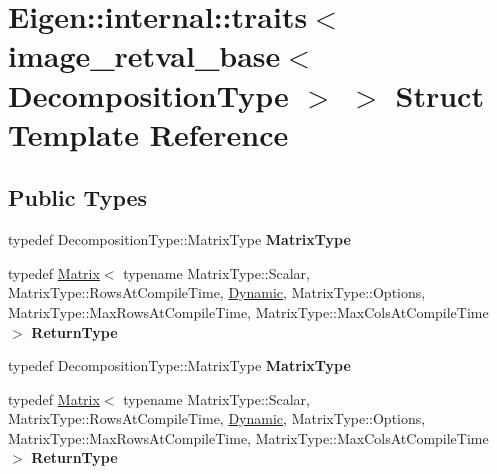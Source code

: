 \hypertarget{struct_eigen_1_1internal_1_1traits_3_01image__retval__base_3_01_decomposition_type_01_4_01_4}{}\section{Eigen\+:\+:internal\+:\+:traits$<$ image\+\_\+retval\+\_\+base$<$ Decomposition\+Type $>$ $>$ Struct Template Reference}
\label{struct_eigen_1_1internal_1_1traits_3_01image__retval__base_3_01_decomposition_type_01_4_01_4}
\subsection*{Public Types}
\begin{DoxyCompactItemize}
\item 
\mbox{\label{struct_eigen_1_1internal_1_1traits_3_01image__retval__base_3_01_decomposition_type_01_4_01_4_a984a2d61b1d9938a50ac081801969a76}} 
typedef Decomposition\+Type\+::\+Matrix\+Type {\bfseries Matrix\+Type}
\item 
\mbox{\label{struct_eigen_1_1internal_1_1traits_3_01image__retval__base_3_01_decomposition_type_01_4_01_4_a0dd246199d9ee579731c1567a1769572}} 
typedef \hyperlink{group___core___module_class_eigen_1_1_matrix}{Matrix}$<$ typename Matrix\+Type\+::\+Scalar, Matrix\+Type\+::\+Rows\+At\+Compile\+Time, \hyperlink{namespace_eigen_ad81fa7195215a0ce30017dfac309f0b2}{Dynamic}, Matrix\+Type\+::\+Options, Matrix\+Type\+::\+Max\+Rows\+At\+Compile\+Time, Matrix\+Type\+::\+Max\+Cols\+At\+Compile\+Time $>$ {\bfseries Return\+Type}
\item 
\mbox{\label{struct_eigen_1_1internal_1_1traits_3_01image__retval__base_3_01_decomposition_type_01_4_01_4_a984a2d61b1d9938a50ac081801969a76}} 
typedef Decomposition\+Type\+::\+Matrix\+Type {\bfseries Matrix\+Type}
\item 
\mbox{\label{struct_eigen_1_1internal_1_1traits_3_01image__retval__base_3_01_decomposition_type_01_4_01_4_a0dd246199d9ee579731c1567a1769572}} 
typedef \hyperlink{group___core___module_class_eigen_1_1_matrix}{Matrix}$<$ typename Matrix\+Type\+::\+Scalar, Matrix\+Type\+::\+Rows\+At\+Compile\+Time, \hyperlink{namespace_eigen_ad81fa7195215a0ce30017dfac309f0b2}{Dynamic}, Matrix\+Type\+::\+Options, Matrix\+Type\+::\+Max\+Rows\+At\+Compile\+Time, Matrix\+Type\+::\+Max\+Cols\+At\+Compile\+Time $>$ {\bfseries Return\+Type}
\end{DoxyCompactItemize}


